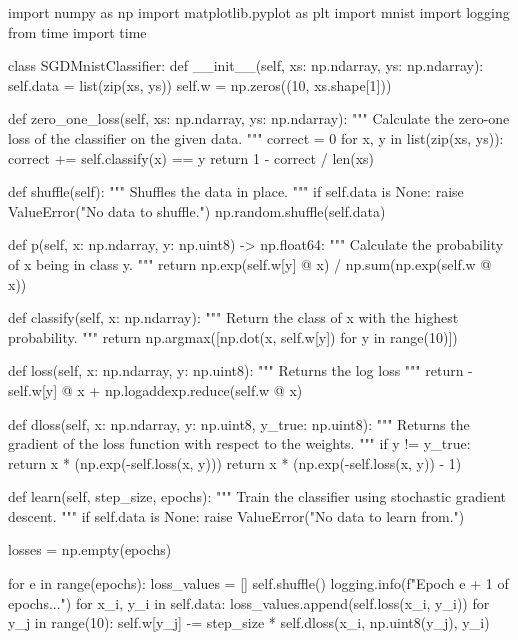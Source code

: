 \documentclass{exam}
\begin{document}
\begin{python}
    import numpy as np
    import matplotlib.pyplot as plt
    import mnist
    import logging
    from time import time


    class SGDMnistClassifier:
        def __init__(self, xs: np.ndarray, ys: np.ndarray):
            self.data = list(zip(xs, ys))
            self.w = np.zeros((10, xs.shape[1]))

        def zero_one_loss(self, xs: np.ndarray, ys: np.ndarray):
            """
            Calculate the zero-one loss of the classifier on the given data.
            """
            correct = 0
            for x, y in list(zip(xs, ys)):
                correct += self.classify(x) == y
            return 1 - correct / len(xs)

        def shuffle(self):
            """
            Shuffles the data in place.
            """
            if self.data is None:
                raise ValueError("No data to shuffle.")
            np.random.shuffle(self.data)

        def p(self, x: np.ndarray, y: np.uint8) -> np.float64:
            """
            Calculate the probability of x being in class y.
            """
            return np.exp(self.w[y] @ x) / np.sum(np.exp(self.w @ x))

        def classify(self, x: np.ndarray):
            """
            Return the class of x with the highest probability.
            """
            return np.argmax([np.dot(x, self.w[y]) for y in range(10)])

        def loss(self, x: np.ndarray, y: np.uint8):
            """
            Returns the log loss
            """
            return -self.w[y] @ x + np.logaddexp.reduce(self.w @ x)

        def dloss(self, x: np.ndarray, y: np.uint8, y_true: np.uint8):
            """
            Returns the gradient of the loss function with respect to the weights.
            """
            if y != y_true:
                return x * (np.exp(-self.loss(x, y)))
            return x * (np.exp(-self.loss(x, y)) - 1)

        def learn(self, step_size, epochs):
            """
            Train the classifier using stochastic gradient descent.
            """
            if self.data is None:
                raise ValueError("No data to learn from.")

            losses = np.empty(epochs)

            for e in range(epochs):
                loss_values = []
                self.shuffle()
                logging.info(f"Epoch {e + 1} of {epochs}...")
                for x_i, y_i in self.data:
                    loss_values.append(self.loss(x_i, y_i))
                    for y_j in range(10):
                        self.w[y_j] -= step_size * self.dloss(x_i, np.uint8(y_j), y_i)


\end{python}
\end{document}
